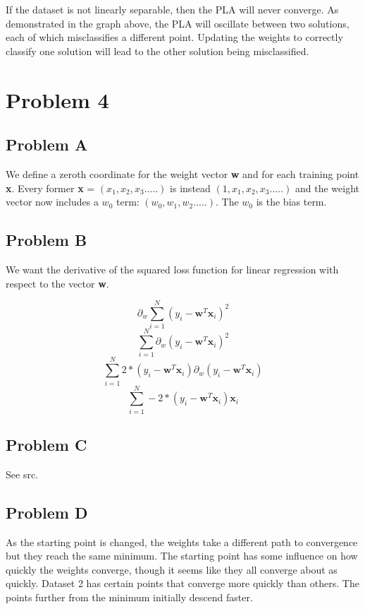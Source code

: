 \documentclass[12pt]{article} %
\begin{document}
If the dataset is not linearly separable, then the PLA will never converge. As demonstrated in the graph above, the PLA will oscillate between two solutions, each of which misclassifies a different point. Updating the weights to correctly classify one solution will lead to the other solution being misclassified.

\section{Problem 4}
\subsection{Problem A}
We define a zeroth coordinate for the weight vector \textbf{w} and for each training point \textbf{x}. Every former \textbf{x} = $(x_1, x_2, x_3.....)$ is instead $(1, x_1, x_2, x_3.....)$ and the weight vector now includes a $w_0$ term: $(w_0, w_1, w_2.....)$. The $w_0$ is the bias term.


\subsection{Problem B}
We want the derivative of the squared loss function for linear regression with respect to the vector \textbf{w}.

$$\partial _w \sum_{i = 1}^{N} (y_i - \textbf{w}^T\textbf{x}_i)^2$$
$$\sum_{i = 1}^{N} \partial _w (y_i - \textbf{w}^T\textbf{x}_i)^2$$
$$\sum_{i = 1}^{N} 2 * (y_i - \textbf{w}^T\textbf{x}_i) \partial _w (y_i - \textbf{w}^T\textbf{x}_i)$$
$$\sum_{i = 1}^{N} -2 * (y_i - \textbf{w}^T\textbf{x}_i) \textbf{x}_i$$

\subsection{Problem C}
See src.



\subsection{Problem D}
As the starting point is changed, the weights take a different path to convergence but they reach the same minimum. The starting point has some influence on how quickly the weights converge, though it seems like they all converge about as quickly. Dataset 2 has certain points that converge more quickly than others. The points further from the minimum initially descend faster.
\end{document}
